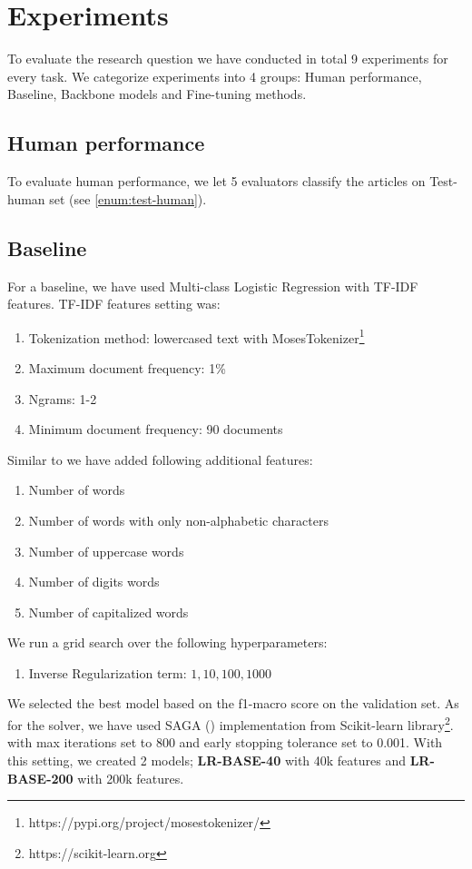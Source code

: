 \chapter{Experiments}
\label{chap:experiments}
To evaluate the research question we have conducted in total 9 experiments for every task.
We categorize experiments into 4 groups: Human performance, Baseline, Backbone models and Fine-tuning methods.

\section{Human performance}
\label{sec:human}
To evaluate human performance, we let 5 evaluators classify the articles on Test-human set (see \autoref{enum:test-human}).

\section{Baseline}
For a baseline, we have used Multi-class Logistic Regression with TF-IDF features.
TF-IDF features setting was:
\begin{enumerate}
    \item Tokenization method: lowercased text with MosesTokenizer\footnote{https://pypi.org/project/mosestokenizer/}
    \item Maximum document frequency: 1\%
    \item Ngrams: 1-2
    \item Minimum document frequency: 90 documents
\end{enumerate}
Similar to \cite{strakaSumeCzechLargeCzech2018a} we have added following additional features:
\begin{enumerate}
    \item Number of words
    \item Number of words with only non-alphabetic characters
    \item Number of uppercase words
    \item Number of digits words
    \item Number of capitalized words
\end{enumerate}


We run a grid search over the following hyperparameters:
\begin{enumerate}
    \item Inverse Regularization term: $1, 10, 100, 1000$
\end{enumerate}
We selected the best model based on the f1-macro score on the validation set.
As for the solver, we have used SAGA (\cite{defazioSAGAFastIncremental2014})
 implementation from Scikit-learn library\footnote{https://scikit-learn.org}.
with max iterations set to 800 and early stopping tolerance set to 0.001.
With this setting, we created 2 models; \textbf{LR-BASE-40} with 40k features
 and \textbf{LR-BASE-200} with 200k features.

